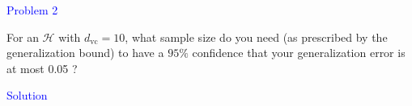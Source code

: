 \textcolor{blue}{Problem 2}

For an $\mathcal{H}$ with $d_{\mathrm{vc}}=10$, what sample size do you need (as prescribed by the generalization bound) to have a $95 \%$ confidence that your generalization error is at most 0.05 ?

\textcolor{blue}{Solution}\\








\newpage